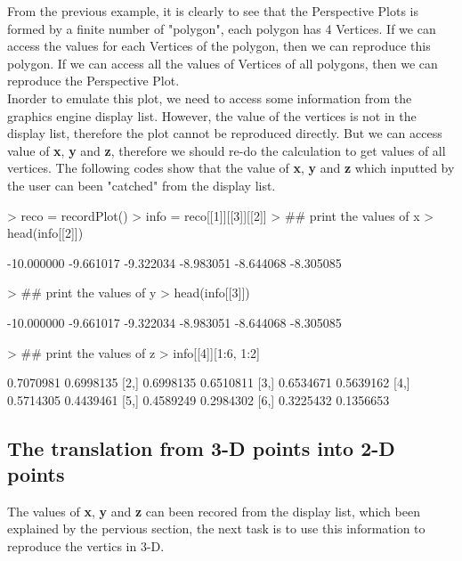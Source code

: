 \documentclass[paper=a4, fontsize=11pt]{report}
\begin{document}
From the previous example, it is clearly to see that the Perspective Plots is formed by a finite number of "polygon", each polygon has 4 Vertices. If we can access the values for each Vertices of the polygon, then we can reproduce this polygon. If we can access all the values of Vertices of all polygons, then we can reproduce the Perspective Plot. \\

Inorder to emulate this plot, we need to access some information from the graphics engine display list. However, the value of the vertices is not in the display list, therefore the plot cannot be reproduced directly. But we can access value of \textbf{x}, \textbf{y} and \textbf{z}, therefore we should re-do the calculation to get values of all vertices. The following codes show that the value of \textbf{x}, \textbf{y} and \textbf{z} which inputted by the user can been "catched" from the display list.
\begin{Schunk}
\begin{Sinput}
> reco = recordPlot()
> info = reco[[1]][[3]][[2]]
> ## print the values of x
> head(info[[2]])
\end{Sinput}
\begin{Soutput}
[1] -10.000000  -9.661017  -9.322034  -8.983051  -8.644068  -8.305085
\end{Soutput}
\begin{Sinput}
> ## print the values of y
> head(info[[3]])
\end{Sinput}
\begin{Soutput}
[1] -10.000000  -9.661017  -9.322034  -8.983051  -8.644068  -8.305085
\end{Soutput}
\begin{Sinput}
> ## print the values of z
> info[[4]][1:6, 1:2]
\end{Sinput}
\begin{Soutput}
          [,1]      [,2]
[1,] 0.7070981 0.6998135
[2,] 0.6998135 0.6510811
[3,] 0.6534671 0.5639162
[4,] 0.5714305 0.4439461
[5,] 0.4589249 0.2984302
[6,] 0.3225432 0.1356653
\end{Soutput}
\end{Schunk}
\subsection{The translation from 3-D points into 2-D points}
The values of \textbf{x}, \textbf{y} and \textbf{z} can been recored from the display list, which been explained by the pervious section, the next task is to use this information to reproduce the vertics in 3-D.\\
\end{document}
